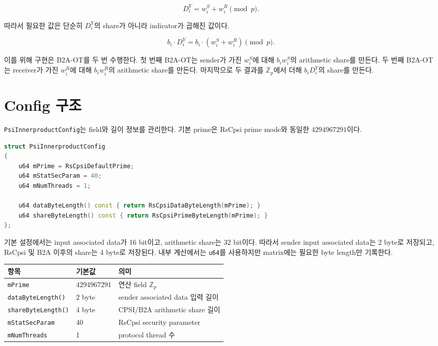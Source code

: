 \documentclass[11pt]{article}
\begin{document}
\[
  D_i^Y = w_i^S + w_i^R \pmod p.
\]

따라서 필요한 값은 단순히 \(D_i^Y\)의 share가 아니라 indicator가 곱해진 값이다.

\[
  b_i \cdot D_i^Y = b_i \cdot (w_i^S+w_i^R) \pmod p.
\]

이를 위해 구현은 B2A-OT를 두 번 수행한다. 첫 번째 B2A-OT는 sender가 가진
\(w_i^S\)에 대해 \(b_i w_i^S\)의 arithmetic share를 만든다. 두 번째 B2A-OT는
receiver가 가진 \(w_i^R\)에 대해 \(b_i w_i^R\)의 arithmetic share를 만든다.
마지막으로 두 결과를 \(\mathbb{Z}_p\)에서 더해 \(b_iD_i^Y\)의 share를 만든다.

\section*{Config 구조}

\texttt{PsiInnerproductConfig}는 field와 길이 정보를 관리한다. 기본 prime은
RsCpsi prime mode와 동일한 \(4294967291\)이다.

\begin{lstlisting}[language=C++]
struct PsiInnerproductConfig
{
    u64 mPrime = RsCpsiDefaultPrime;
    u64 mStatSecParam = 40;
    u64 mNumThreads = 1;

    u64 dataByteLength() const { return RsCpsiDataByteLength(mPrime); }
    u64 shareByteLength() const { return RsCpsiPrimeByteLength(mPrime); }
};
\end{lstlisting}

기본 설정에서는 input associated data가 16 bit이고, arithmetic share는 32 bit이다.
따라서 sender input associated data는 2 byte로 저장되고, RsCpsi 및 B2A 이후의
share는 4 byte로 저장된다. 내부 계산에서는 \texttt{u64}를 사용하지만 matrix에는
필요한 byte length만 기록한다.

\begin{table}[h]
\centering
\begin{tabular}{lll}
\toprule
항목 & 기본값 & 의미 \\
\midrule
\texttt{mPrime} & \(4294967291\) & 연산 field \(\mathbb{Z}_p\) \\
\texttt{dataByteLength()} & 2 byte & sender associated data 입력 길이 \\
\texttt{shareByteLength()} & 4 byte & CPSI/B2A arithmetic share 길이 \\
\texttt{mStatSecParam} & 40 & RsCpsi security parameter \\
\texttt{mNumThreads} & 1 & protocol thread 수 \\
\bottomrule
\end{tabular}
\end{table}
\end{document}

